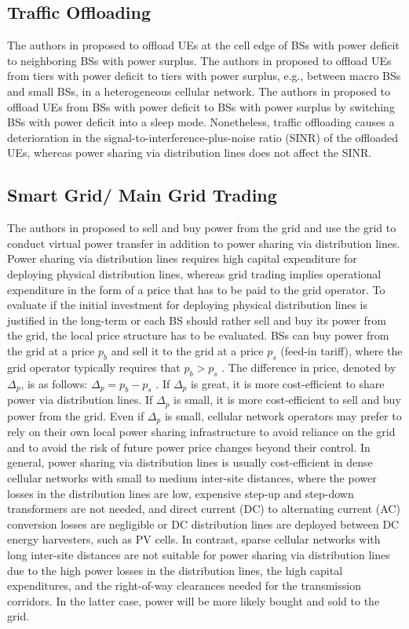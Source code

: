 \subsection{Traffic Offloading}
The authors in \cite{7273976} proposed to offload UEs at the cell edge of BSs with power deficit to neighboring BSs with power surplus. The authors in \cite{WildemeerschMatthias2013CSCN,Pei-ShanYu2016TOiH} proposed to offload UEs from tiers with power deficit to tiers with power surplus, e.g., between macro BSs and small BSs, in a heterogeneous cellular network. The authors in \cite{JingjinWu2015EBST,Huang2017,MinWookKang2017AEES} proposed to offload UEs from BSs with power deficit to BSs with power surplus by switching BSs with power deficit into a sleep mode. Nonetheless, traffic offloading causes a deterioration in the signal-to-interference-plus-noise ratio (SINR) of the offloaded UEs, whereas power sharing via distribution lines does not affect the SINR.
\subsection{Smart Grid/ Main Grid Trading}
The authors in \cite{7779131, 7841800} proposed to sell and buy power from the grid and use the grid to conduct virtual power transfer in addition to power sharing via distribution lines. Power sharing via distribution lines requires high capital expenditure for deploying physical distribution lines, whereas grid trading implies operational expenditure in the form of a price that has to be paid to the grid operator. To evaluate if the initial investment for deploying physical distribution lines is justified in the long-term or each BS should rather sell and buy its power from the grid, the local price structure has to be evaluated. BSs can buy power from the grid at a price $p_b$ and sell it to the grid at a price $p_s$ (feed-in tariff), where the grid operator typically requires that $p_b > p_s$ \cite{JieXu2016CETi}. The difference in price, denoted by $\Delta_p$, is as follows: $\Delta_p=p_b-p_s$ \cite{JieXu2015Cgcn}. 
If $\Delta_p$ is great, it is more cost-efficient to share power via distribution lines. If  $\Delta_p$ is small, it is more cost-efficient to sell and buy power from the grid. Even if  $\Delta_p$ is small, cellular network operators may prefer to rely on their own local power sharing infrastructure to avoid reliance on the grid and to avoid the risk of future power price changes beyond their control. In general, power sharing via distribution lines is usually cost-efficient in dense cellular networks with small to medium inter-site distances, where the power losses in the distribution lines are low, expensive step-up and step-down transformers are not needed, and direct current (DC) to alternating current (AC) conversion losses are negligible or DC distribution lines are deployed between DC energy harvesters, such as PV cells.  
In contrast, sparse cellular networks with long inter-site distances are not suitable for power sharing via distribution lines due to the high power losses in the distribution lines, the high capital expenditures, and the right-of-way clearances needed for the transmission corridors. In the latter case, power will be more likely bought and sold to the grid.
